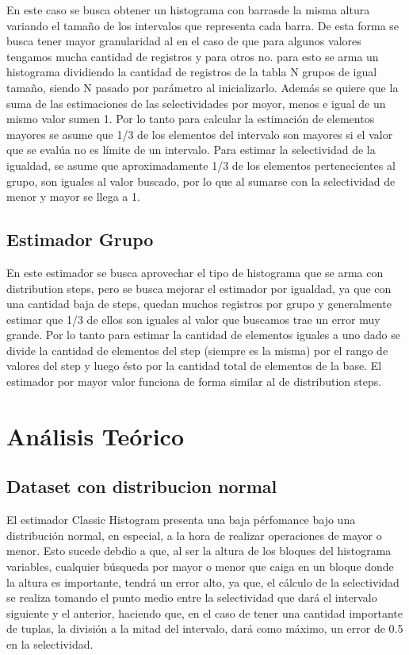 \documentclass[a4paper, 10pt, twoside]{article}
\begin{document}
En este caso se busca obtener un histograma con barrasde la misma altura variando el
tamaño de los intervalos que representa cada barra. De esta forma se busca tener mayor
 granularidad al en el caso de que para algunos valores tengamos mucha cantidad de
 registros y para otros no. para esto se arma un histograma dividiendo la cantidad de
 registros de la tabla N grupos de igual tamaño, siendo N pasado por parámetro al
 inicializarlo. Además se quiere que la suma de las estimaciones de las selectividades
 por moyor, menos e igual de un mismo valor sumen 1.
Por lo tanto para calcular la estimación de elementos mayores se asume que 1/3 de los
elementos del intervalo son mayores si el valor que se evalúa no es límite de un
intervalo. Para estimar la selectividad de la igualdad, se asume que aproximadamente
 1/3 de los elementos pertenecientes al grupo, son iguales al valor buscado,
 por lo que al sumarse con la selectividad de menor y mayor se llega a 1.

\subsection{Estimador Grupo}

En este estimador se busca aprovechar el tipo de histograma que se arma con distribution steps,
pero se busca mejorar el estimador por igualdad, ya que con una cantidad baja de steps, quedan muchos registros por
grupo y generalmente estimar que 1/3 de ellos son iguales al valor que buscamos trae un error muy grande.
Por lo tanto para estimar la cantidad de elementos iguales a uno dado se divide la cantidad de elementos del step
(siempre es la misma) por el rango de valores del step y luego ésto por la cantidad total de elementos de la base.
El estimador por mayor valor funciona de forma similar al de distribution steps.



\section{Análisis Teórico}

\subsection{Dataset con distribucion normal}
El estimador Classic Histogram presenta una baja pérfomance bajo una distribución normal, en especial, a la hora de realizar operaciones de mayor o menor.
Esto sucede debdio a que, al ser la altura de los bloques del histograma variables, cualquier búsqueda por mayor o menor que caiga en un bloque
donde la altura es importante, tendrá un error alto, ya que, el cálculo de la selectividad se realiza tomando el punto medio entre la selectividad que dará
el intervalo siguiente y el anterior, haciendo que, en el caso de tener una cantidad importante de tuplas, la división a la mitad del intervalo, dará como máximo,
un error de 0.5 en la selectividad.
\end{document}
